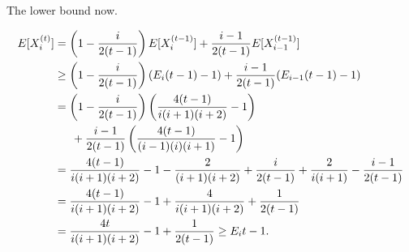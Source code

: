 The lower bound now.

\begin{align}
E[X_i^{(t)}] &= \left(1-\frac{i}{2(t-1)}\right)E[X_i^{(t-1)}] +\frac{i -1}{2(t-1)}E[X_{i-1}^{(t-1)}]\\
&\geq \left(1-\frac{i}{2(t-1)}\right)(E_i(t-1)-1) +\frac{i -1}{2(t-1)}(E_{i-1}(t-1)-1)\\
&=\left(1-\frac{i}{2(t-1)}\right)\left(\frac{4(t-1)}{i(i+1)(i+2)}-1\right)\\
&\indent+\frac{i -1}{2(t-1)}\left(\frac{4(t-1)}{(i-1)(i)(i+1)}-1\right)\\
&=\frac{4(t-1)}{i(i+1)(i+2)} -1 -\frac{2}{(i+1)(i+2)} +\frac{i}{2(t-1)} + \frac{2}{i(i+1)} - \frac{i-1}{2(t-1)}\\
&=\frac{4(t-1)}{i(i+1)(i+2)} -1 +\frac{4}{i(i+1)(i+2)} +\frac{1}{2(t-1)}\\
&=\frac{4t}{i(i+1)(i+2)} -1 +\frac{1}{2(t-1)} \geq E_it-1.
\end{align}